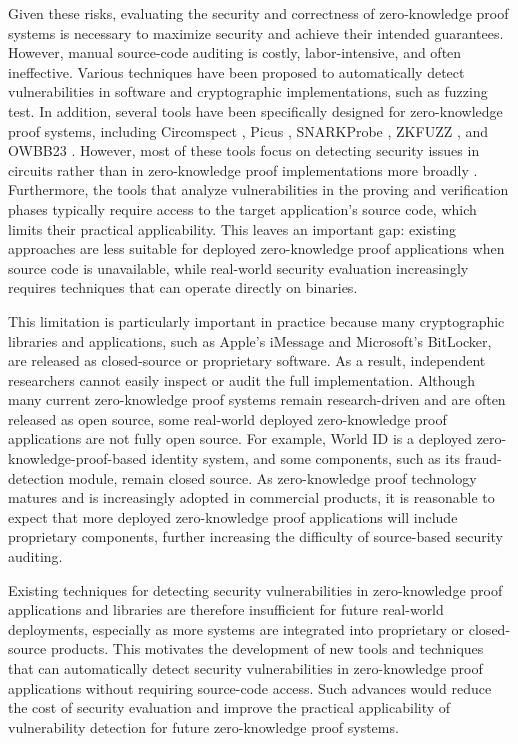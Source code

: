 Given these risks, evaluating the security and correctness of zero-knowledge proof systems is necessary to maximize security and achieve their intended guarantees. However, manual source-code auditing is costly, labor-intensive, and often ineffective. Various techniques have been proposed to automatically detect vulnerabilities in software and cryptographic implementations, such as fuzzing test. In addition, several tools have been specifically designed for zero-knowledge proof systems, including Circomspect \cite{trailofbits2023circomspect}, Picus \cite{pailoor2023automated}, SNARKProbe \cite{fan2024snarkprobe}, ZKFUZZ \cite{takahashi2026zkfuzz}, and OWBB23 \cite{ozdemir2025bounded}. However, most of these tools focus on detecting security issues in circuits rather than in zero-knowledge proof implementations more broadly \cite{chaliasos2024sok}. Furthermore, the tools that analyze vulnerabilities in the proving and verification phases typically require access to the target application's source code, which limits their practical applicability. This leaves an important gap: existing approaches are less suitable for deployed zero-knowledge proof applications when source code is unavailable, while real-world security evaluation increasingly requires techniques that can operate directly on binaries.

This limitation is particularly important in practice because many cryptographic libraries and applications, such as Apple's iMessage and Microsoft's BitLocker, are released as closed-source or proprietary software. As a result, independent researchers cannot easily inspect or audit the full implementation. Although many current zero-knowledge proof systems remain research-driven and are often released as open source, some real-world deployed zero-knowledge proof applications are not fully open source. For example, World ID \cite{world_advancing_decentralization} is a deployed zero-knowledge-proof-based identity system, and some components, such as its fraud-detection module, remain closed source. As zero-knowledge proof technology matures and is increasingly adopted in commercial products, it is reasonable to expect that more deployed zero-knowledge proof applications will include proprietary components, further increasing the difficulty of source-based security auditing.

Existing techniques for detecting security vulnerabilities in zero-knowledge proof applications and libraries are therefore insufficient for future real-world deployments, especially as more systems are integrated into proprietary or closed-source products. This motivates the development of new tools and techniques that can automatically detect security vulnerabilities in zero-knowledge proof applications without requiring source-code access. Such advances would reduce the cost of security evaluation and improve the practical applicability of vulnerability detection for future zero-knowledge proof systems.

